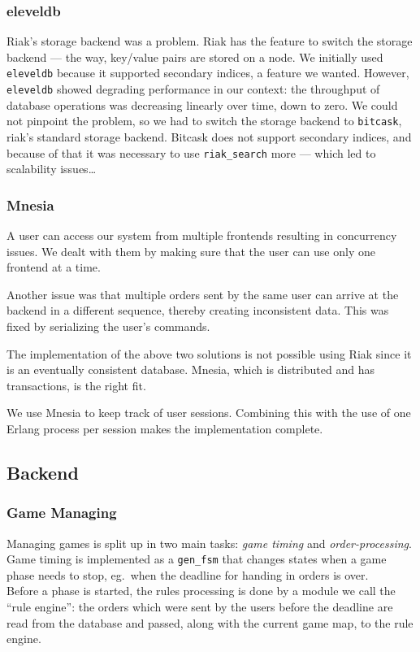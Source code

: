 \documentclass[11pt,a4paper]{report}
\begin{document}
\subsubsection{eleveldb}
Riak's storage backend was a problem. Riak has the feature to switch the
storage backend --- the way, key/value pairs are stored on a node.
We initially used {\tt eleveldb} because it supported secondary indices, a
feature we wanted. However, {\tt eleveldb} showed degrading performance
in our context: the throughput of database operations was decreasing linearly
over time, down to zero. We could not pinpoint the problem, so we had to switch
the storage backend to {\tt bitcask}, riak's standard storage backend.
Bitcask does not support secondary indices, and because of that it was
necessary to use {\tt riak\_search} more --- which led to scalability
issues\ldots

\subsubsection{Mnesia}
A user can access our system from multiple frontends resulting in
concurrency issues. We dealt with them by making sure that the user
can use only one frontend at a time.

Another issue was that multiple orders sent by the same user can arrive at the
backend in a different sequence, thereby creating inconsistent data. This was
fixed by serializing the user's commands.

The implementation of the above two solutions is not possible using Riak since
it is an eventually consistent database. Mnesia, which is distributed and has
transactions, is the right fit.

We use Mnesia to keep track of user sessions. Combining this with
the use of one Erlang process per session makes the implementation complete.


\subsection{Backend}
\subsubsection{Game Managing}
Managing games is split up in two main tasks: {\em game timing\/} and
{\em order-processing}. \\
Game timing is implemented as a {\tt gen\_fsm} that changes states when a game
phase needs to stop, eg.\ when the deadline for handing in orders is over.\\
Before a phase is started, the rules processing is done by a module we call
the ``rule engine'': the orders which were sent by the users before the
deadline are read from the database and passed, along with the current game
map, to the rule engine.
\end{document}
